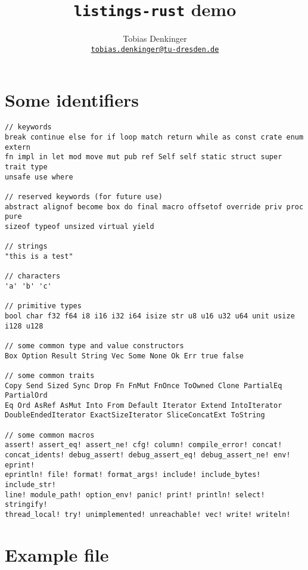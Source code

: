 \documentclass[DIV13]{scrartcl}
\title{\texttt{listings-rust} demo}
\author{Tobias Denkinger \\ \href{mailto:tobias.denkinger@gmx.de}{\texttt{tobias.denkinger@tu-dresden.de}}}
\begin{document}
\maketitle

\section*{Some identifiers}

\begin{lstlisting}
// keywords
break continue else for if loop match return while as const crate enum extern
fn impl in let mod move mut pub ref Self self static struct super trait type
unsafe use where
 
// reserved keywords (for future use)
abstract alignof become box do final macro offsetof override priv proc pure
sizeof typeof unsized virtual yield 

// strings
"this is a test"

// characters
'a' 'b' 'c'

// primitive types
bool char f32 f64 i8 i16 i32 i64 isize str u8 u16 u32 u64 unit usize i128 u128

// some common type and value constructors
Box Option Result String Vec Some None Ok Err true false

// some common traits
Copy Send Sized Sync Drop Fn FnMut FnOnce ToOwned Clone PartialEq PartialOrd
Eq Ord AsRef AsMut Into From Default Iterator Extend IntoIterator
DoubleEndedIterator ExactSizeIterator SliceConcatExt ToString

// some common macros
assert! assert_eq! assert_ne! cfg! column! compile_error! concat!
concat_idents! debug_assert! debug_assert_eq! debug_assert_ne! env! eprint!
eprintln! file! format! format_args! include! include_bytes! include_str!
line! module_path! option_env! panic! print! println! select! stringify!
thread_local! try! unimplemented! unreachable! vec! write! writeln!
\end{lstlisting}

\clearpage

\section*{Example file}
\end{document}
